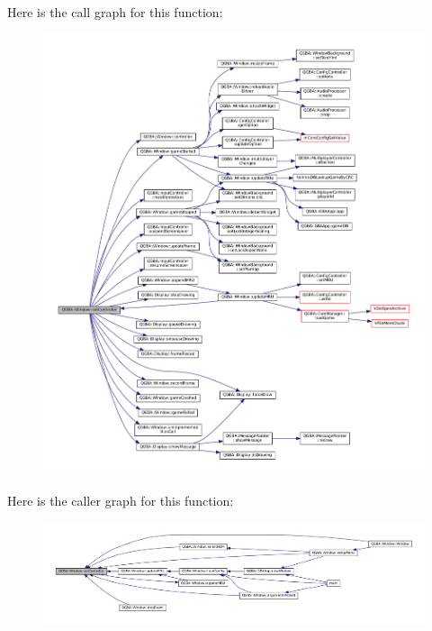 Here is the call graph for this function\+:
\nopagebreak
\begin{figure}[H]
\begin{center}
\leavevmode
\includegraphics[width=350pt]{class_q_g_b_a_1_1_window_abe01a1ebe877d333fb60c3f0fc621f0c_cgraph}
\end{center}
\end{figure}
Here is the caller graph for this function\+:
\nopagebreak
\begin{figure}[H]
\begin{center}
\leavevmode
\includegraphics[width=350pt]{class_q_g_b_a_1_1_window_abe01a1ebe877d333fb60c3f0fc621f0c_icgraph}
\end{center}
\end{figure}
\mbox{\label{class_q_g_b_a_1_1_window_a529d32e64893056a7307db1ccfd10df9}} 
